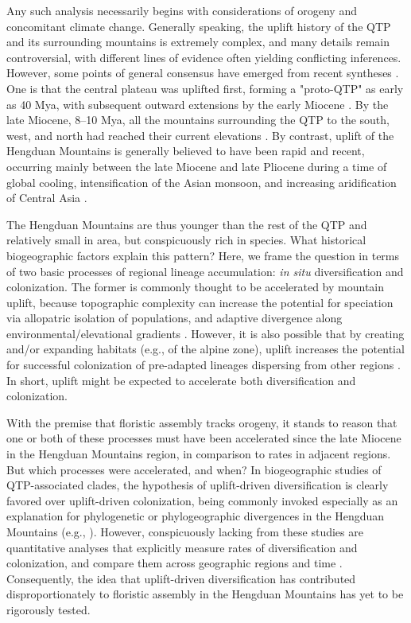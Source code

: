 Any such analysis necessarily begins with considerations of orogeny and concomitant climate change. Generally speaking, the uplift history of the QTP and its surrounding mountains is extremely complex, and many details remain controversial, with different lines of evidence often yielding conflicting inferences. However, some points of general consensus have emerged from recent syntheses \citep{Wang2014,Favre2014,Deng2015}. One is that the central plateau was uplifted first, forming a "proto-QTP" as early as 40 Mya, with subsequent outward extensions by the early Miocene \citep{Rowley2006,Wang2014}. By the late Miocene, 8--10 Mya, all the mountains surrounding the QTP to the south, west, and north had reached their current elevations \citep{SunB2011,Fang2005,WangE2012,Wang2014,Favre2014,Deng2015}. By contrast, uplift of the Hengduan Mountains is generally believed to have been rapid and recent, occurring mainly between the late Miocene and late Pliocene \citep{WangE2012,Wang2014,Meng2016,SunB2011} during a time of global cooling, intensification of the Asian monsoon, and increasing aridification of Central Asia \citep{Favre2014}.

The Hengduan Mountains are thus younger than the rest of the QTP and relatively small in area, but conspicuously rich in species. What historical biogeographic factors explain this pattern? Here, we frame the question in terms of two basic processes of regional lineage accumulation: \textit{in situ} diversification and colonization. The former is commonly thought to be accelerated by mountain uplift, because topographic complexity can increase the potential for speciation via allopatric isolation of populations, and adaptive divergence along environmental/elevational gradients \citep{Hughes2006,LiuJ2006,Xu2010}. However, it is also possible that by creating and/or expanding habitats (e.g., of the alpine zone), uplift increases the potential for successful colonization of pre-adapted lineages dispersing from other regions \citep{Zhou2013}. In short, uplift might be expected to accelerate both diversification and colonization.

With the premise that floristic assembly tracks orogeny, it stands to reason that one or both of these processes must have been accelerated since the late Miocene in the Hengduan Mountains region, in comparison to rates in adjacent regions. But which processes were accelerated, and when? In biogeographic studies of QTP-associated clades, the hypothesis of uplift-driven diversification is clearly favored over uplift-driven colonization, being commonly invoked especially as an explanation for phylogenetic or phylogeographic divergences in the Hengduan Mountains (e.g., \citealt{LiuJ2006,WangY2009,ZhangJ2014}). However, conspicuously lacking from these studies are quantitative analyses that explicitly measure rates of diversification and colonization, and compare them across geographic regions and time \citep{Wen2014,Favre2014}. Consequently, the idea that uplift-driven diversification has contributed disproportionately to floristic assembly in the Hengduan Mountains has yet to be rigorously tested.

